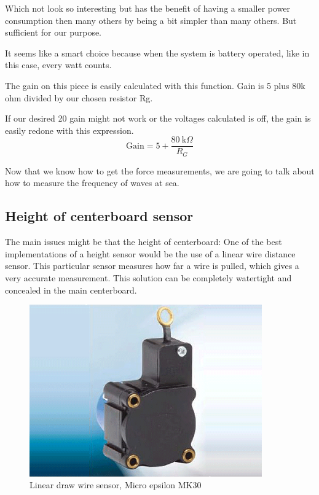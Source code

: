 Which not look so interesting but has the benefit of having a smaller power consumption then many others by being a bit simpler than many others. But sufficient for our purpose.

It seems like a smart choice because when the system is battery operated, like in this case, every watt counts.

The gain on this piece is easily calculated with this function. Gain is 5 plus 80k ohm divided by our chosen resistor Rg. %



If our desired 20 gain might not work or the voltages calculated is off, the gain is easily redone with this expression. %
\begin{equation}%
\textrm{Gain} = 5 + \frac{80~\textrm{k}\Omega}{R_G}
\end{equation}


Now that we know how to get the force measurements, we are going to talk about how to measure the frequency of waves at sea.


\subsection{Height of centerboard sensor}

The main issues might be that the height of centerboard: %
One of the best implementations of a height sensor would be the use of a linear wire distance sensor. This particular sensor measures how far a wire is pulled, which gives a very accurate measurement. This solution can be completely watertight and concealed in the main centerboard.  

\begin{figure}[H]%
\begin{center}
	\includegraphics[width = 10cm]{Figures/microepsilon_mk30.png}
	\caption{Linear draw wire sensor, Micro epsilon MK30}
	\label{Draw_sensor}
\end{center}
\end{figure}
 
